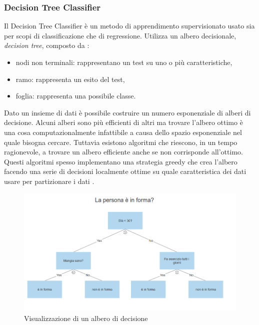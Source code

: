 \documentclass[12pt,italian]{report}
\begin{document}
\subsubsection{Decision Tree Classifier}
Il Decision Tree Classifier è un metodo di apprendimento supervisionato usato sia per scopi di classificazione che di regressione. Utilizza un albero decisionale, \textit{decision tree}, composto da \cite{DataMiningandKnowledgeDiscoveryHandbook}:
\begin{itemize}
	\item nodi non terminali: rappresentano un test su uno o più caratteristiche,
	\item ramo: rappresenta un esito del test,
	\item foglia: rappresenta una possibile classe.
\end{itemize}

Dato un insieme di dati è possibile costruire un numero esponenziale di alberi di decisione. Alcuni alberi sono più efficienti di altri ma trovare l'albero ottimo è una cosa computazionalmente infattibile a causa dello spazio esponenziale nel quale bisogna cercare. Tuttavia esistono algoritmi che riescono, in un tempo ragionevole, a trovare un albero efficiente anche se non corrisponde all'ottimo. Questi algoritmi spesso implementano una strategia greedy che crea l'albero facendo una serie di decisioni localmente ottime su quale caratteristica dei dati usare per partizionare i dati \cite{Introductiontodatamining}.

\begin{figure}[h]
	\centering
	\includegraphics[width = \textwidth]{immagini/Decision_Tree}
	\caption{Visualizzazione di un albero di decisione}
\end{figure}
\end{document}
